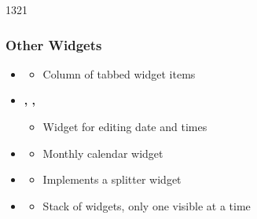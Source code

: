  \begin{slide}{1321}\frametitle{Other Widgets}
   \begin{itemize}
   \item  \textbf{}
     \begin{itemize}
     \item Column of tabbed widget items
     \end{itemize}
   \item \textbf{, , }
     \begin{itemize}
     \item Widget for editing date and times
     \end{itemize}
   \item \textbf{}
     \begin{itemize}
     \item Monthly calendar widget
     \end{itemize}
   \item \textbf{}
     \begin{itemize}
     \item Implements a splitter widget
     \end{itemize}
   \item \textbf{}
     \begin{itemize}
     \item Stack of widgets, only one visible at a time
     \end{itemize}
 \end{itemize}
\end{slide}
